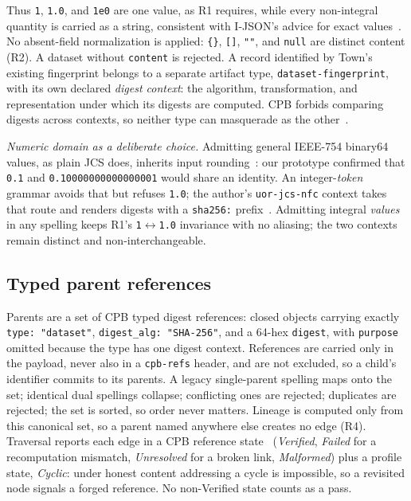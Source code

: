 \documentclass[conference]{IEEEtran}
\begin{document}
Thus \texttt{1}, \texttt{1.0}, and \texttt{1e0} are one value, as R1 requires, while every non-integral quantity is carried as a string, consistent with I-JSON's advice for exact values~\cite{rfc7493}. No absent-field normalization is applied: \texttt{\{\}}, \texttt{[]}, \texttt{""}, and \texttt{null} are distinct content (R2). A dataset without \texttt{content} is rejected. A record identified by Town's existing fingerprint belongs to a separate artifact type, \texttt{dataset-fingerprint}, with its own declared \emph{digest context}: the algorithm, transformation, and representation under which its digests are computed. CPB forbids comparing digests across contexts, so neither type can masquerade as the other~\cite{cpb03}.

\emph{Numeric domain as a deliberate choice.} Admitting general IEEE-754 binary64 values, as plain JCS does, inherits input rounding~\cite{rfc8785}: our prototype confirmed that \texttt{0.1} and \texttt{0.10000000000000001} would share an identity. An integer-\emph{token} grammar avoids that but refuses \texttt{1.0}; the author's \texttt{uor-jcs-nfc} context takes that route and renders digests with a \texttt{sha256:} prefix~\cite{uorjcsnfc}. Admitting integral \emph{values} in any spelling keeps R1's \texttt{1}$\leftrightarrow$\texttt{1.0} invariance with no aliasing; the two contexts remain distinct and non-interchangeable.

\subsection{Typed parent references}\label{sec:parents}
Parents are a set of CPB typed digest references: closed objects carrying exactly \texttt{type: "dataset"}, \texttt{digest\_alg: "SHA-256"}, and a 64-hex \texttt{digest}, with \texttt{purpose} omitted because the type has one digest context. References are carried only in the payload, never also in a \texttt{cpb-refs} header, and are not excluded, so a child's identifier commits to its parents. A legacy single-parent spelling maps onto the set; identical dual spellings collapse; conflicting ones are rejected; duplicates are rejected; the set is sorted, so order never matters. Lineage is computed only from this canonical set, so a parent named anywhere else creates no edge (R4). Traversal reports each edge in a CPB reference state~\cite{cpb03} (\emph{Verified}, \emph{Failed} for a recomputation mismatch, \emph{Unresolved} for a broken link, \emph{Malformed}) plus a profile state, \emph{Cyclic}: under honest content addressing a cycle is impossible, so a revisited node signals a forged reference. No non-Verified state counts as a pass.
\end{document}
